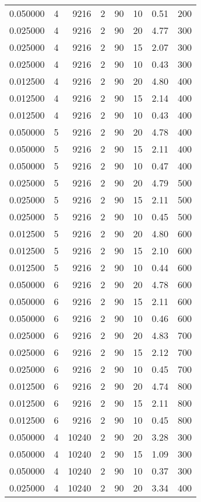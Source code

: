 \documentclass[12pt,letterpaper]{article}
\begin{document}
\begin{center}
\begin{longtable}{r|r|r|r|r|r|r|r}
0.050000 & 4 & 9216 & 2 & 90 & 10 & 0.51 & 200 \\
0.025000 & 4 & 9216 & 2 & 90 & 20 & 4.77 & 300 \\
0.025000 & 4 & 9216 & 2 & 90 & 15 & 2.07 & 300 \\
0.025000 & 4 & 9216 & 2 & 90 & 10 & 0.43 & 300 \\
0.012500 & 4 & 9216 & 2 & 90 & 20 & 4.80 & 400 \\
0.012500 & 4 & 9216 & 2 & 90 & 15 & 2.14 & 400 \\
0.012500 & 4 & 9216 & 2 & 90 & 10 & 0.43 & 400 \\
0.050000 & 5 & 9216 & 2 & 90 & 20 & 4.78 & 400 \\
0.050000 & 5 & 9216 & 2 & 90 & 15 & 2.11 & 400 \\
0.050000 & 5 & 9216 & 2 & 90 & 10 & 0.47 & 400 \\
0.025000 & 5 & 9216 & 2 & 90 & 20 & 4.79 & 500 \\
0.025000 & 5 & 9216 & 2 & 90 & 15 & 2.11 & 500 \\
0.025000 & 5 & 9216 & 2 & 90 & 10 & 0.45 & 500 \\
0.012500 & 5 & 9216 & 2 & 90 & 20 & 4.80 & 600 \\
0.012500 & 5 & 9216 & 2 & 90 & 15 & 2.10 & 600 \\
0.012500 & 5 & 9216 & 2 & 90 & 10 & 0.44 & 600 \\
0.050000 & 6 & 9216 & 2 & 90 & 20 & 4.78 & 600 \\
0.050000 & 6 & 9216 & 2 & 90 & 15 & 2.11 & 600 \\
0.050000 & 6 & 9216 & 2 & 90 & 10 & 0.46 & 600 \\
0.025000 & 6 & 9216 & 2 & 90 & 20 & 4.83 & 700 \\
0.025000 & 6 & 9216 & 2 & 90 & 15 & 2.12 & 700 \\
0.025000 & 6 & 9216 & 2 & 90 & 10 & 0.45 & 700 \\
0.012500 & 6 & 9216 & 2 & 90 & 20 & 4.74 & 800 \\
0.012500 & 6 & 9216 & 2 & 90 & 15 & 2.11 & 800 \\
0.012500 & 6 & 9216 & 2 & 90 & 10 & 0.45 & 800 \\
0.050000 & 4 & 10240 & 2 & 90 & 20 & 3.28 & 300 \\
0.050000 & 4 & 10240 & 2 & 90 & 15 & 1.09 & 300 \\
0.050000 & 4 & 10240 & 2 & 90 & 10 & 0.37 & 300 \\
0.025000 & 4 & 10240 & 2 & 90 & 20 & 3.34 & 400 \\

\end{longtable}
\end{center}
\end{document}
